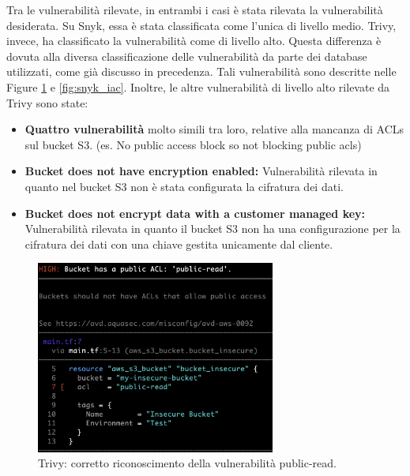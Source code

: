 Tra le vulnerabilità rilevate, in entrambi i casi è stata rilevata la vulnerabilità desiderata. Su Snyk, essa è stata classificata come l'unica di livello medio. Trivy, invece, ha classificato la vulnerabilità come di livello alto. Questa differenza è dovuta alla diversa classificazione delle vulnerabilità da parte dei database utilizzati, come già discusso in precedenza. Tali vulnerabilità sono descritte nelle Figure \ref{fig:trivy_iac} e \ref{fig:snyk_iac}.
Inoltre, le altre vulnerabilità di livello alto rilevate da Trivy sono state:
\begin{itemize}
   \item \textbf{Quattro vulnerabilità} molto simili tra loro, relative alla mancanza di ACLs sul bucket S3. (es. No public access block so not blocking public acls)
   \item \textbf{Bucket does not have encryption enabled:} Vulnerabilità rilevata in quanto nel bucket S3 non è stata configurata la cifratura dei dati.
   \item \textbf{Bucket does not encrypt data with a customer managed key:} Vulnerabilità rilevata in quanto il bucket S3 non ha una configurazione per la cifratura dei dati con una chiave gestita unicamente dal cliente.

\end{itemize}

\begin{figure}[H]
   \centering
   \includegraphics[width=0.7\textwidth]{immagini/capitolo2/trivy_iac.png}
   \caption{Trivy: corretto riconoscimento della vulnerabilità public-read.}
   \label{fig:trivy_iac}
\end{figure}

